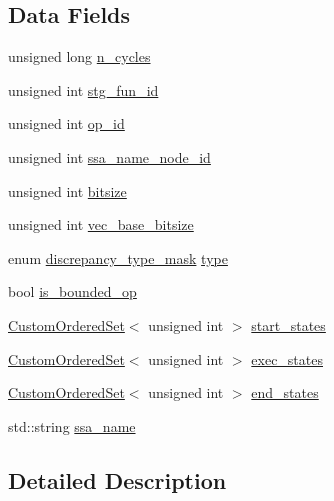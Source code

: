 \subsection*{Data Fields}
\begin{DoxyCompactItemize}
\item 
unsigned long \hyperlink{classDiscrepancyOpInfo_a55176f34c8219cd3876fadd2ff157300}{n\+\_\+cycles}
\item 
unsigned int \hyperlink{classDiscrepancyOpInfo_ab7fe9cfd3d581143f337ddea82422bc4}{stg\+\_\+fun\+\_\+id}
\item 
unsigned int \hyperlink{classDiscrepancyOpInfo_adee91c8c6dfc27ad92bed475f2f63b8c}{op\+\_\+id}
\item 
unsigned int \hyperlink{classDiscrepancyOpInfo_a5e8101913bea1a5937a8fa1dbbae13f0}{ssa\+\_\+name\+\_\+node\+\_\+id}
\item 
unsigned int \hyperlink{classDiscrepancyOpInfo_ad316fe02fb9b8b574a5a7f90f5a05fd0}{bitsize}
\item 
unsigned int \hyperlink{classDiscrepancyOpInfo_acdb7eeecd6adf54bbfff9ec0336d9aa6}{vec\+\_\+base\+\_\+bitsize}
\item 
enum \hyperlink{DiscrepancyOpInfo_8hpp_ae95cd44b11919bdb0ddc5eb2dbe46e09}{discrepancy\+\_\+type\+\_\+mask} \hyperlink{classDiscrepancyOpInfo_a61eee913fc7187aa7f30f7a79dcc3ff7}{type}
\item 
bool \hyperlink{classDiscrepancyOpInfo_a84075a05542c612833c1edd7e1517911}{is\+\_\+bounded\+\_\+op}
\item 
\hyperlink{classCustomOrderedSet}{Custom\+Ordered\+Set}$<$ unsigned int $>$ \hyperlink{classDiscrepancyOpInfo_a9ba4229673f184344f19cf37db450e99}{start\+\_\+states}
\item 
\hyperlink{classCustomOrderedSet}{Custom\+Ordered\+Set}$<$ unsigned int $>$ \hyperlink{classDiscrepancyOpInfo_a90b8d325b6ecdee02809645564d1cb8b}{exec\+\_\+states}
\item 
\hyperlink{classCustomOrderedSet}{Custom\+Ordered\+Set}$<$ unsigned int $>$ \hyperlink{classDiscrepancyOpInfo_a9be06b77ea509fa96912a241f3f23569}{end\+\_\+states}
\item 
std\+::string \hyperlink{classDiscrepancyOpInfo_a93148e45bc36148dc7640125dc13a348}{ssa\+\_\+name}
\end{DoxyCompactItemize}


\subsection{Detailed Description}


